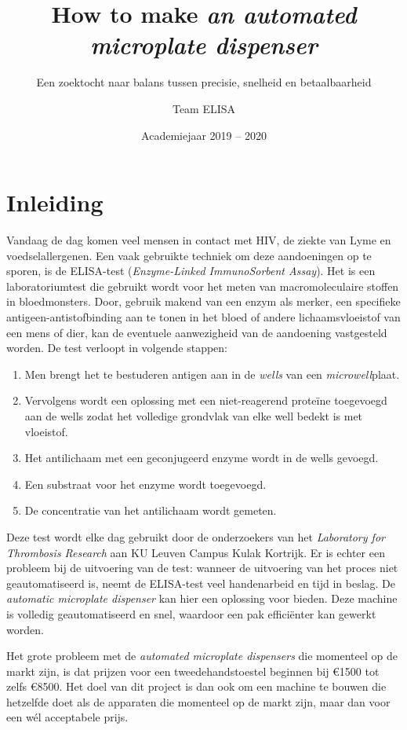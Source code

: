 \documentclass[a4paper,twoside,kulak]{kulakreport} %
\title{How to make \textit{an automated microplate dispenser}}
\subtitle{Een zoektocht naar balans tussen precisie, snelheid en betaalbaarheid}
\author{Team ELISA}
\institute{Matthias Derez, Maxime Dujardin, Korneel Verkens, Seppe Vilain}
\date{Academiejaar 2019 -- 2020}
\begin{document}

\titlepage

\tableofcontents

\chapter*{Inleiding}
Vandaag de dag komen veel mensen in contact met HIV, de ziekte van Lyme en voedselallergenen. Een vaak gebruikte techniek om deze aandoeningen op te sporen, is de ELISA-test (\textit{Enzyme-Linked ImmunoSorbent Assay}). Het is een laboratoriumtest die gebruikt wordt voor het meten van macromoleculaire stoffen in bloedmonsters. Door, gebruik makend van een enzym als merker, een specifieke antigeen-antistofbinding aan te tonen in het bloed of andere lichaamsvloeistof van een mens of dier, kan de eventuele aanwezigheid van de aandoening vastgesteld worden. 
\newline
De test verloopt in volgende stappen:
\begin{enumerate}
	\item Men brengt het te bestuderen antigen aan in de \textit{wells} van een \textit{microwell}plaat.
	\item Vervolgens wordt een oplossing met een niet-reagerend proteïne toegevoegd aan de wells zodat het volledige grondvlak van elke well bedekt is met vloeistof.
	\item Het antilichaam met een geconjugeerd enzyme wordt in de wells gevoegd.
	\item Een substraat voor het enzyme wordt toegevoegd. 
	\item De concentratie van het antilichaam wordt gemeten.
\end{enumerate}
Deze test wordt elke dag gebruikt door de onderzoekers van het \textit{Laboratory for Thrombosis Research} aan KU Leuven Campus Kulak Kortrijk. Er is echter een probleem bij de uitvoering van de test: wanneer de uitvoering van het proces niet geautomatiseerd is, neemt de ELISA-test veel handenarbeid en tijd in beslag. De \textit{automatic microplate dispenser} kan hier een oplossing voor bieden. Deze machine is volledig geautomatiseerd en snel, waardoor een pak efficiënter kan gewerkt worden. 

Het grote probleem met de \textit{automated microplate dispensers} die momenteel op de markt zijn, is dat prijzen voor een tweedehandstoestel beginnen bij \euro 1500 tot zelfs \euro 8500. Het doel van dit project is dan ook om een machine te bouwen die hetzelfde doet als de apparaten die momenteel op de markt zijn, maar dan voor een wél acceptabele prijs.
\end{document}
